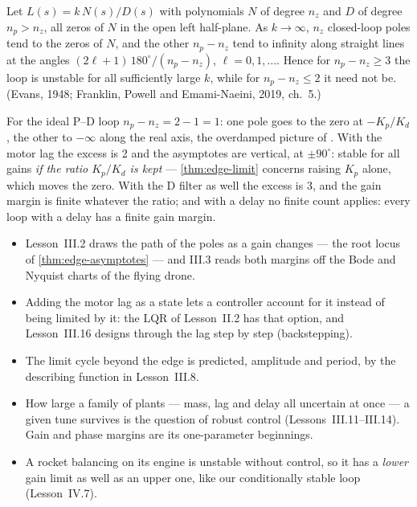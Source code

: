 \begin{theorem}
\label{thm:edge-asymptotes}
Let $L(s) = k\,N(s)/D(s)$ with polynomials $N$ of degree $n_z$ and $D$ of degree $n_p > n_z$, all zeros of $N$ in the open left half-plane. As $k \to \infty$, $n_z$ closed-loop poles tend to the zeros of $N$, and the other $n_p - n_z$ tend to infinity along straight lines at the angles $(2\ell + 1)\,180^\circ/(n_p - n_z)$, $\ell = 0, 1, \dots$. Hence for $n_p - n_z \ge 3$ the loop is unstable for all sufficiently large $k$, while for $n_p - n_z \le 2$ it need not be. (Evans, 1948; Franklin, Powell and Emami-Naeini, 2019, ch.~5.)
\end{theorem}

For the ideal P–D loop $n_p - n_z = 2 - 1 = 1$: one pole goes to the zero at $-K_p/K_d$, the other to $-\infty$ along the real axis, the overdamped picture of . With the motor lag the excess is 2 and the asymptotes are vertical, at $\pm90^\circ$: stable for all gains \emph{if the ratio $K_p/K_d$ is kept} — \cref{thm:edge-limit} concerns raising $K_p$ alone, which moves the zero. With the D filter as well the excess is 3, and the gain margin is finite whatever the ratio; and with a delay no finite count applies: every loop with a delay has a finite gain margin.

\begin{lookahead}
\begin{itemize}[leftmargin=1.2em]
  \item Lesson~III.2 draws the path of the poles as a gain changes — the root locus of \cref{thm:edge-asymptotes} — and III.3 reads both margins off the Bode and Nyquist charts of the flying drone.
  \item Adding the motor lag as a state lets a controller account for it instead of being limited by it: the LQR of Lesson~II.2 has that option, and Lesson~III.16 designs through the lag step by step (backstepping).
  \item The limit cycle beyond the edge is predicted, amplitude and period, by the describing function in Lesson~III.8.
  \item How large a family of plants — mass, lag and delay all uncertain at once — a given tune survives is the question of robust control (Lessons~III.11–III.14). Gain and phase margins are its one-parameter beginnings.
  \item A rocket balancing on its engine is unstable without control, so it has a \emph{lower} gain limit as well as an upper one, like our conditionally stable loop (Lesson~IV.7).
\end{itemize}
\end{lookahead}

